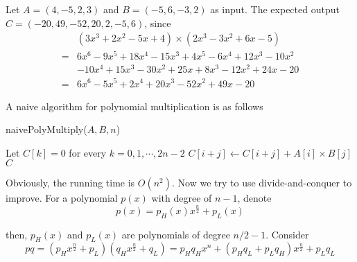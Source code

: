                     \begin{example}
                        Let $A = (4, -5, 2, 3)$ and $B = (-5, 6, -3, 2)$ as input. The expected output $C = (-20, 49, -52, 20, 2, -5, 6)$, since
                        \begin{align*}
                            &(3 x^3 + 2 x^2 - 5 x + 4) \times (2 x^3 - 3 x^2 + 6x - 5)\\
                           =& 6 x^6 - 9 x^5 + 18 x^4 - 15 x^3 + 4 x^5 - 6x^4 + 12x^3 - 10 x^2\\
                            & -10 x^4 + 15 x^3 - 30 x^2 + 25 x + 8 x^3 - 12 x^2 + 24 x - 20\\
                           =& 6 x^6 - 5 x^5 + 2x^4 + 20x^3 - 52 x^2 + 49 x - 20
                        \end{align*}
                    \end{example}

                    A naive algorithm for polynomial multiplication is as follows
                    \begin{algorithm}[H]
                        \caption{naivePolyMultiply($A, B, n$)}
                        \begin{algorithmic}[1]
                            \State Let $C[k] = 0$ for every $k = 0, 1, \cdots, 2n - 2$
                                    \State $C[i + j] \gets C[i + j] + A[i] \times B[j]$
                                \EndFor
                            \EndFor
                            \State \Return $C$
                        \end{algorithmic}
                    \end{algorithm}

                    Obviously, the running time is $O(n^2)$. Now we try to use divide-and-conquer to improve. For a polynomial $p(x)$ with degree of $n - 1$, denote
                    \begin{equation*}
                        p(x) = p_H(x) x^{\frac{n}{2}} + p_L(x)
                    \end{equation*}

                    then, $p_H(x)$ and $p_L(x)$ are polynomials of degree $n/2 - 1$. Consider
                    \begin{equation*}
                        pq = (p_H x^{\frac{n}{2}} + p_L)(q_H x^{\frac{n}{2}} + q_L) = p_Hq_Hx^n + (p_Hq_L + p_Lq_H)x^{\frac{n}{2}} + p_Lq_L
                    \end{equation*}

